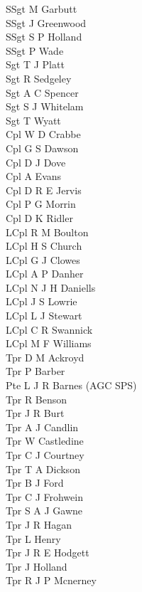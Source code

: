 \begin{multicols}{2}
  \noindent
  SSgt M Garbutt \\
  SSgt J Greenwood \\
  SSgt S P Holland \\
  SSgt P Wade \\
  Sgt T J Platt \\
  Sgt R Sedgeley \\
  Sgt A C Spencer \\
  Sgt S J Whitelam \\
  Sgt T Wyatt \\
  Cpl W D Crabbe \\
  Cpl G S Dawson \\
  Cpl D J Dove \\
  Cpl A Evans \\
  Cpl D R E Jervis \\
  Cpl P G Morrin \\
  Cpl D K Ridler \\
  LCpl R M Boulton \\
  LCpl H S Church \\
  LCpl G J Clowes \\
  LCpl A P Danher \\
  LCpl N J H Daniells \\
  LCpl J S Lowrie \\
  LCpl L J Stewart \\
  LCpl C R Swannick \\
  LCpl M F Williams \\
  Tpr D M Ackroyd \\
  Tpr P Barber \\
  Pte L J R Barnes (AGC SPS) \\
  Tpr R Benson \\
  Tpr J R Burt \\
  Tpr A J Candlin \\
  Tpr W Castledine \\
  Tpr C J Courtney \\
  Tpr T A Dickson \\
  Tpr B J Ford \\
  Tpr C J Frohwein \\
  Tpr S A J Gawne \\
  Tpr J R Hagan \\
  Tpr L Henry \\
  Tpr J R E Hodgett \\
  Tpr J Holland \\
  Tpr R J P Mcnerney \\

\end{multicols}
